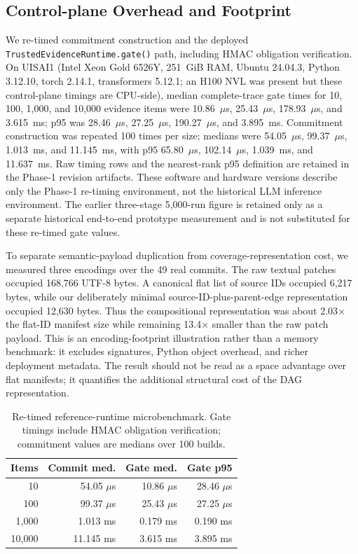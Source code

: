 \documentclass[journal,compsoc]{IEEEtran}
\begin{document}
\subsection{Control-plane Overhead and Footprint}
We re-timed commitment construction and the deployed \texttt{TrustedEvidenceRuntime.gate()} path, including HMAC obligation verification. On UISAI1 (Intel Xeon Gold 6526Y, 251~GiB RAM, Ubuntu 24.04.3, Python 3.12.10, torch 2.14.1, transformers 5.12.1; an H100 NVL was present but these control-plane timings are CPU-side), median complete-trace gate times for 10, 100, 1,000, and 10,000 evidence items were 10.86~$\mu$s, 25.43~$\mu$s, 178.93~$\mu$s, and 3.615~ms; p95 was 28.46~$\mu$s, 27.25~$\mu$s, 190.27~$\mu$s, and 3.895~ms. Commitment construction was repeated 100 times per size; medians were 54.05~$\mu$s, 99.37~$\mu$s, 1.013~ms, and 11.145~ms, with p95 65.80~$\mu$s, 102.14~$\mu$s, 1.039~ms, and 11.637~ms. Raw timing rows and the nearest-rank p95 definition are retained in the Phase-1 revision artifacts. These software and hardware versions describe only the Phase-1 re-timing environment, not the historical LLM inference environment. The earlier three-stage 5,000-run figure is retained only as a separate historical end-to-end prototype measurement and is not substituted for these re-timed gate values.

To separate semantic-payload duplication from coverage-representation cost, we measured three encodings over the 49 real commits. The raw textual patches occupied 168,766 UTF-8 bytes. A canonical flat list of source IDs occupied 6,217 bytes, while our deliberately minimal source-ID-plus-parent-edge representation occupied 12,630 bytes. Thus the compositional representation was about 2.03$\times$ the flat-ID manifest size while remaining 13.4$\times$ smaller than the raw patch payload. This is an encoding-footprint illustration rather than a memory benchmark: it excludes signatures, Python object overhead, and richer deployment metadata. The result should not be read as a space advantage over flat manifests; it quantifies the additional structural cost of the DAG representation.

\begin{table}[t]
\centering
\caption{Re-timed reference-runtime microbenchmark. Gate timings include HMAC obligation verification; commitment values are medians over 100 builds.}
\begin{tabular}{rrrr}
\toprule
Items & Commit med. & Gate med. & Gate p95 \\
\midrule
10 & 54.05 $\mu$s & 10.86 $\mu$s & 28.46 $\mu$s \\
100 & 99.37 $\mu$s & 25.43 $\mu$s & 27.25 $\mu$s \\
1,000 & 1.013 ms & 0.179 ms & 0.190 ms \\
10,000 & 11.145 ms & 3.615 ms & 3.895 ms \\
\bottomrule
\end{tabular}
\end{table}
\end{document}
